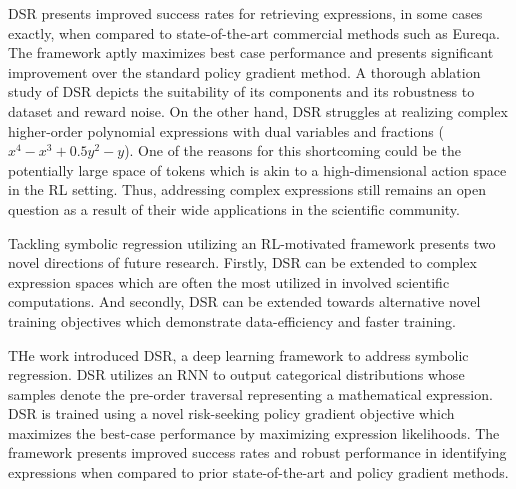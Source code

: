 \documentclass[11pt,letterpaper]{article}
\begin{document}
DSR presents improved success rates for retrieving expressions, in some cases exactly, when compared to state-of-the-art commercial methods such as Eureqa. The framework aptly maximizes best case performance and presents significant improvement over the standard policy gradient method. A thorough ablation study of DSR depicts the suitability of its components and its robustness to dataset and reward noise. On the other hand, DSR struggles at realizing complex higher-order polynomial expressions with dual variables and fractions ($x^{4} - x^{3} + 0.5y^{2} - y$). One of the reasons for this shortcoming could be the potentially large space of tokens which is akin to a high-dimensional action space in the RL setting. Thus, addressing complex expressions still remains an open question as a result of their wide applications in the scientific community. 

Tackling symbolic regression utilizing an RL-motivated framework presents two novel directions of future research. Firstly, DSR can be extended to complex expression spaces which are often the most utilized in involved scientific computations. And secondly, DSR can be extended towards alternative novel training objectives which demonstrate data-efficiency and faster training. 

THe work introduced DSR, a deep learning framework to address symbolic regression. DSR utilizes an RNN to output categorical distributions whose samples denote the pre-order traversal representing a mathematical expression. DSR is trained using a novel risk-seeking policy gradient objective which maximizes the best-case performance by maximizing expression likelihoods. The framework presents improved success rates and robust performance in identifying expressions when compared to prior state-of-the-art and policy gradient methods. 
\end{document}

